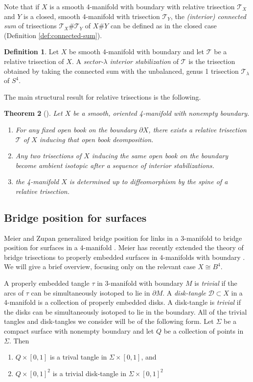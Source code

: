 \documentclass[11pt]{amsart}
\newtheorem{theorem}{Theorem}[section]
\theoremstyle{definition}
\newtheorem{definition}[theorem]{Definition}
\theoremstyle{remark}
\numberwithin{equation}{section}
\newcommand{\cT}{\mathcal{T}}
\newcommand{\cD}{\mathcal{D}}
\newcommand{\del}{\partial}
\begin{document}
Note that if $X$ is a smooth 4-manifold with boundary with relative trisection $\cT_X$ and $Y$ is a closed, smooth 4-manifold with trisection $\cT_Y$, the {\it (interior) connected sum} of trisections $\cT_X \# \cT_Y$ of $X \# Y$ can be defined as in the closed case (Definition \ref{def:connected-sum}).

\begin{definition}
Let $X$ be smooth 4-manifold with boundary and let $\cT$ be a relative trisection of $X$. A {\it sector-$\lambda$ interior stabilization} of $\cT$ is the trisection obtained by taking the connected sum with the unbalanced, genus 1 trisection $\cT_{\lambda}$ of $S^4$.
\end{definition}

The main structural result for relative trisections is the following.

\begin{theorem}[\cite{Gay-Kirby}]
Let $X$ be a smooth, oriented 4-manifold with nonempty boundary.
\begin{enumerate}
\item For any fixed open book on the boundary $\del X$, there exists a relative trisection $\cT$  of $X$ inducing that open book deomposition.
\item Any two trisections of $X$ inducing the same open book on the boundary become ambient isotopic after a sequence of interior stabilizations.
\item the 4-manifold $X$ is determined up to diffeomorphism by the spine of a relative trisection.
\end{enumerate}
\end{theorem}

\subsection{Bridge position for surfaces}

Meier and Zupan generalized bridge position for links in a 3-manifold to bridge position for surfaces in a 4-manifold \cite{MZ1,MZ2}.  Meier has recently extended the theory of bridge trisections to properly embedded surfaces in 4-manifolds with boundary \cite{Meier-Relative-Bridge}.  We will give a brief overview, focusing only on the relevant case $X \cong B^4$.

A properly embedded tangle $\tau$ in 3-manifold with boundary $M$ is {\it trivial} if the arcs of $\tau$ can be simultaneously isotoped to lie in $\del M$.  A {\it disk-tangle} $\cD \subset X$ in a 4-manifold is a collection of properly embedded disks.  A disk-tangle is {\it trivial} if the disks can be simultaneously isotoped to lie in the boundary. All of the trivial tangles and disk-tangles we consider will be of the following form.  Let $\Sigma$ be a compact surface with nonempty boundary and let $Q$ be a collection of points in $\Sigma$.  Then
\begin{enumerate}
    \item $Q \times [0,1]$ is a trival tangle in $\Sigma \times [0,1]$, and
    \item $Q \times [0,1]^2$ is a trivial disk-tangle in $\Sigma \times [0,1]^2$
\end{enumerate}
\end{document}
